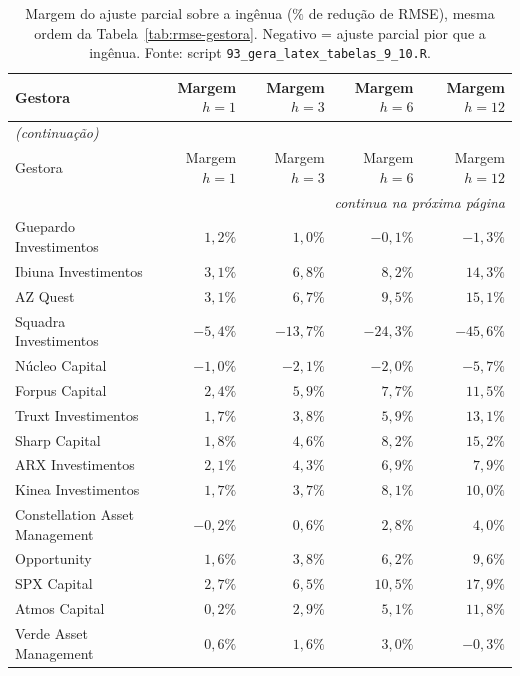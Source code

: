 \documentclass[11pt,a4paper]{article}
\begin{document}
\begin{center}\scriptsize
\begin{longtable}{@{}lrrrr@{}}
\caption{Margem do ajuste parcial sobre a ingênua ($\%$ de redução de RMSE), mesma ordem da
Tabela~\ref{tab:rmse-gestora}. Negativo = ajuste parcial pior que a ingênua. Fonte: script
\texttt{93\_gera\_latex\_tabelas\_9\_10.R}.}
\label{tab:margem-gestora}\\
\toprule
Gestora & Margem $h{=}1$ & Margem $h{=}3$ & Margem $h{=}6$ & Margem $h{=}12$ \\
\midrule
\endfirsthead
\multicolumn{5}{l}{\textit{(continuação)}}\\
\toprule
Gestora & Margem $h{=}1$ & Margem $h{=}3$ & Margem $h{=}6$ & Margem $h{=}12$ \\
\midrule
\endhead
\midrule
\multicolumn{5}{r}{\textit{continua na próxima página}}\\
\endfoot
\bottomrule
\endlastfoot
Guepardo Investimentos & $1{,}2\%$ & $1{,}0\%$ & $-0{,}1\%$ & $-1{,}3\%$ \\
Ibiuna Investimentos & $3{,}1\%$ & $6{,}8\%$ & $8{,}2\%$ & $14{,}3\%$ \\
AZ Quest & $3{,}1\%$ & $6{,}7\%$ & $9{,}5\%$ & $15{,}1\%$ \\
Squadra Investimentos & $-5{,}4\%$ & $-13{,}7\%$ & $-24{,}3\%$ & $-45{,}6\%$ \\
Núcleo Capital & $-1{,}0\%$ & $-2{,}1\%$ & $-2{,}0\%$ & $-5{,}7\%$ \\
Forpus Capital & $2{,}4\%$ & $5{,}9\%$ & $7{,}7\%$ & $11{,}5\%$ \\
Truxt Investimentos & $1{,}7\%$ & $3{,}8\%$ & $5{,}9\%$ & $13{,}1\%$ \\
Sharp Capital & $1{,}8\%$ & $4{,}6\%$ & $8{,}2\%$ & $15{,}2\%$ \\
ARX Investimentos & $2{,}1\%$ & $4{,}3\%$ & $6{,}9\%$ & $7{,}9\%$ \\
Kinea Investimentos & $1{,}7\%$ & $3{,}7\%$ & $8{,}1\%$ & $10{,}0\%$ \\
Constellation Asset Management & $-0{,}2\%$ & $0{,}6\%$ & $2{,}8\%$ & $4{,}0\%$ \\
Opportunity & $1{,}6\%$ & $3{,}8\%$ & $6{,}2\%$ & $9{,}6\%$ \\
SPX Capital & $2{,}7\%$ & $6{,}5\%$ & $10{,}5\%$ & $17{,}9\%$ \\
Atmos Capital & $0{,}2\%$ & $2{,}9\%$ & $5{,}1\%$ & $11{,}8\%$ \\
Verde Asset Management & $0{,}6\%$ & $1{,}6\%$ & $3{,}0\%$ & $-0{,}3\%$ \\

\end{longtable}
\end{center}
\end{document}
